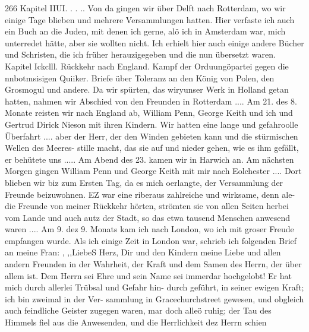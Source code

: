 266 Kapitel IIUI.
. . .. Von da gingen wir über Delft nach Rotterdam, wo wir
einige Tage blieben und mehrere Versammlungen hatten. Hier
verfaste ich auch ein Buch an die Juden, mit denen ich gerne,
alö ich in Amsterdam war, mich unterredet hätte, aber sie wollten
nicht. Ich erhielt hier auch einige andere Bücher und Schristen,
die ich früher herauzigegeben und die nun übersetzt waren.
Kapitel Ickclll.
Rückkehr nach England. Kampf der Orduungöpartei gegen die
nnbotmsisigen Quiiker. Briefe über Toleranz an den König von
Polen, den Grosmogul und andere.
Da wir spürten, das wiryunser Werk in Holland getan
hatten, nahmen wir Abschied von den Freunden in Rotterdam ....
Am 21. des 8. Monate reisten wir nach England ab, William
Penn, George Keith und ich und Gertrud Dirick Nieson mit ihren
Kindern. Wir hatten eine lange und gefahroolle Überfahrt ....
aber der Herr, der den Winden gebieten kann und die stürmischen
Wellen des Meeres- stille macht, das sie auf und nieder gehen,
wie es ihm gefällt, er behütete uns ..... Am Abend des 23.
kamen wir in Harwich an. Am nächsten Morgen gingen William
Penn und George Keith mit mir nach Eolchester .... Dort blieben
wir biz zum Ersten Tag, da es mich oerlangte, der Versammlung
der Freunde beizuwohnen. EZ war eine riberaus zahlreiche und
wirksame, denn ale- die Freunde von meiner Rückkehr hörten,
strömten sie von allen Seiten herbei vom Lande und auch autz
der Stadt, so das etwa tausend Menschen anwesend waren ....
Am 9. dez 9. Monats kam ich nach London, wo ich mit groser
Freude empfangen wurde.
Als ich einige Zeit in London war, schrieb ich folgenden Brief
an meine Fran: ,
,,LiebeS Herz,
Dir und den Kindern meine Liebe und allen andern Freunden
in der Wahrheit, der Kraft und dem Samen des Herrn, der über
allem ist. Dem Herrn sei Ehre und sein Name sei immerdar
hochgelobt! Er hat mich durch allerlei Trübsal und Gefahr hin-
durch geführt, in seiner ewigen Kraft; ich bin zweimal in der Ver-
sammlung in Gracechurchstreet gewesen, und obgleich auch feindliche
Geister zugegen waren, mar doch alleö ruhig; der Tau des Himmels
fiel aus die Anwesenden, und die Herrlichkeit dez Herrn schien


